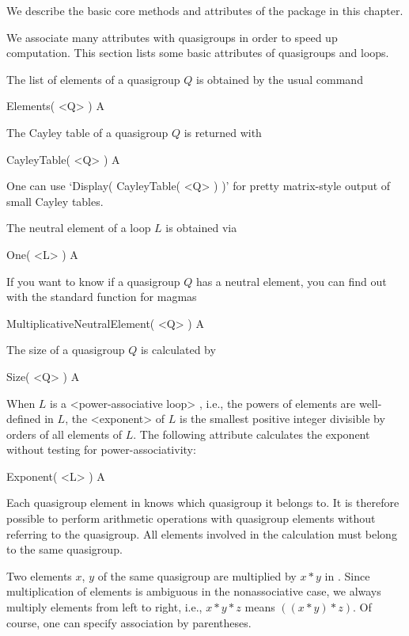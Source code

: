 
We describe the basic core methods and attributes of the {\LOOPS} package in this chapter.


We associate many attributes with quasigroups in order to speed up computation.
This section lists some basic attributes of quasigroups and loops.

The list of elements of a quasigroup $Q$ is obtained by the usual command

\>Elements( <Q> ) A

The Cayley table of a quasigroup $Q$ is returned with

\>CayleyTable( <Q> ) A

One can use `Display( CayleyTable( <Q> ) )' for pretty matrix-style output of
small Cayley tables.

The neutral element of a loop $L$ is obtained via

\>One( <L> ) A

If you want to know if a quasigroup $Q$ has a neutral element, you can find out
with the standard function for magmas

\>MultiplicativeNeutralElement( <Q> ) A

The size of a quasigroup $Q$ is calculated by

\>Size( <Q> ) A

When $L$ is a <power-associative loop>
%
%
, i.e., the powers of elements are well-defined in $L$, the <exponent>
%
%
 of $L$ is the smallest positive
integer divisible by orders of all elements of $L$. The following attribute
calculates the exponent without testing for power-associativity:

\>Exponent( <L> ) A


Each quasigroup element in {\GAP} knows which quasigroup it belongs to. It is
therefore possible to perform arithmetic operations with quasigroup elements
without referring to the quasigroup. All elements involved in the calculation
must belong to the same quasigroup.

Two elements $x$, $y$ of the same quasigroup are multiplied by $x*y$ in {\GAP}.
Since multiplication of elements is ambiguous in the nonassociative case, we
always multiply elements from left to right, i.e., $x*y*z$ means $((x*y)*z)$.
Of course, one can specify association by parentheses.


